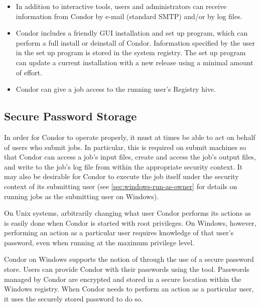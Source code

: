 \begin{itemize}
\item In addition to interactive tools, users and administrators can receive
information from Condor by e-mail (standard SMTP) and/or by log files.

\item Condor includes a friendly GUI installation and set up program,
which can perform a full install or deinstall of Condor.
Information specified by the user in the set up program is stored in the
system registry.  
The set up program can update a current installation with a
new release using a minimal amount of effort.

\item Condor can give a job access to the running user's Registry hive.

\end{itemize}

\subsection{\label{sec:windows-sps}Secure Password Storage}

In order for Condor to operate properly, it must at times be able to
act on behalf of users who submit jobs.  In particular, this is
required on submit machines so that Condor can access a job's input
files, create and access the job's output files, and write to the
job's log file from within the appropriate security context.  It may
also be desirable for Condor to execute the job itself under the
security context of its submitting user (see
\ref{sec:windows-run-as-owner} for details on running jobs as the
submitting user on Windows).

On Unix systems, arbitrarily changing what user Condor performs its
actions as is easily done when Condor is started with root privileges.
On Windows, however, performing an action as a particular user
requires knowledge of that user's password, even when running at the
maximum privilege level.

Condor on Windows supports the notion of 
through the use of a secure password store.  Users can provide Condor
with their passwords using the  tool.  Passwords
managed by Condor are encrypted and stored in a secure location within the
Windows registry.  When Condor needs to perform an action as a
particular user, it uses the securely stored password to do so.

